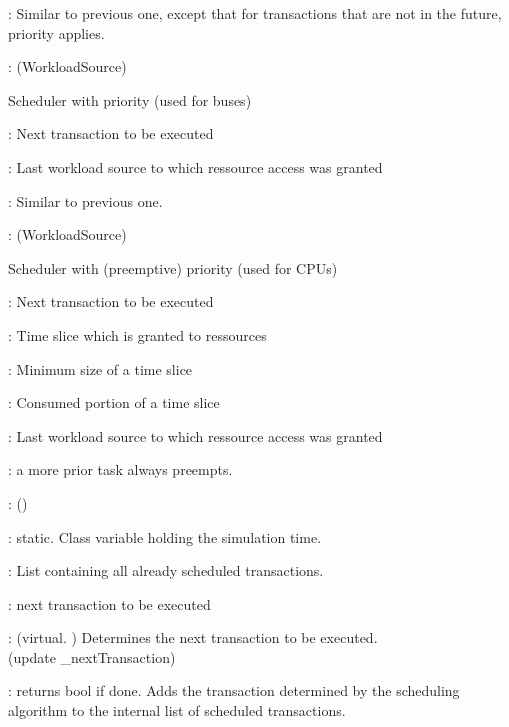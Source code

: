 \documentclass[a4paper,11pt]{article}
\newcommand{\bfont}{\fontseries{b}\selectfont}
\newcommand{\cod}[1]{{\ttfamily #1}}
\newcommand{\class}[2]{\par\vspace{1mm}\hspace{-5mm}\large\colorbox{file}{\textbullet\bfont\cod{#1}:} (\cod{#2})\par}
\newcommand{\method}[1]{\par\vspace{1mm}\hspace{-2mm}\colorbox{method}{\textopenbullet\bfont\cod{#1}:}}
\newcommand{\variable}[1]{\par\vspace{1mm}\hspace{-2mm}\colorbox{variable}{\textopenbullet\bfont\cod{#1}:}}
\begin{document}
\method{schedule(iEndSchedule)} Similar to previous one, except that for transactions that are not in the future, priority applies.

\class{PrioScheduler}{WorkloadSource}
Scheduler with priority (used for buses)
\variable{\_nextTransaction} Next transaction to be executed

\variable{\_lastSource} Last workload source to which ressource access was granted

\method{schedule(iEndSchedule)} Similar to previous one.

\class{StrictPrioScheduler}{WorkloadSource}
Scheduler with (preemptive) priority (used for CPUs)
\variable{\_nextTransaction} Next transaction to be executed

\variable{\_timeSlice} Time slice which is granted to ressources

\variable{\_minSliceSize} Minimum size of a time slice

\variable{\_elapsedTime} Consumed portion of a time slice

\variable{\_lastSource} Last workload source to which ressource access was granted

\method{schedule(iEndSchedule)} a more prior task always preempts.

\class{ScedulableDevice}{}

\variable{\_simulatedTime} static. Class variable holding the simulation time.

\variable{\_transactList}	List containing all already scheduled transactions.

\variable{\_nextTransaction} next transaction to be executed

\method{schedule()} (virtual. ) Determines the next transaction to be executed.\\ (update \cod{\_nextTransaction})

\method{addTransaction(iTransToBeAdded)} returns bool if done. Adds the transaction determined by the scheduling algorithm to the internal list of scheduled transactions.
\end{document}
